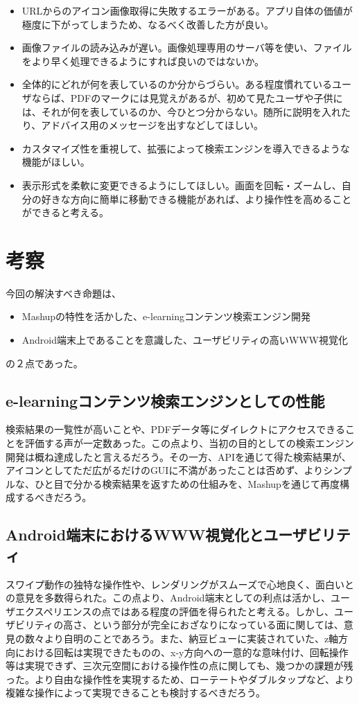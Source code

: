 \begin{itemize}
\item URLからのアイコン画像取得に失敗するエラーがある。アプリ自体の価値が極度に下がってしまうため、なるべく改善した方が良い。
\item 画像ファイルの読み込みが遅い。画像処理専用のサーバ等を使い、ファイルをより早く処理できるようにすれば良いのではないか。
\item 全体的にどれが何を表しているのか分からづらい。ある程度慣れているユーザならば、PDFのマークには見覚えがあるが、初めて見たユーザや子供には、それが何を表しているのか、今ひとつ分からない。随所に説明を入れたり、アドバイス用のメッセージを出すなどしてほしい。
\item カスタマイズ性を重視して、拡張によって検索エンジンを導入できるような機能がほしい。
\item 表示形式を柔軟に変更できるようにしてほしい。画面を回転・ズームし、自分の好きな方向に簡単に移動できる機能があれば、より操作性を高めることができると考える。
\end{itemize}

\section{考察}
今回の解決すべき命題は、
\begin{itemize}
\item Mashupの特性を活かした、e-learningコンテンツ検索エンジン開発
\item Android端末上であることを意識した、ユーザビリティの高いWWW視覚化
\end{itemize}
の２点であった。

\subsection{e-learningコンテンツ検索エンジンとしての性能}
検索結果の一覧性が高いことや、PDFデータ等にダイレクトにアクセスできることを評価する声が一定数あった。この点より、当初の目的としての検索エンジン開発は概ね達成したと言えるだろう。その一方、APIを通じて得た検索結果が、アイコンとしてただ広がるだけのGUIに不満があったことは否めず、よりシンプルな、ひと目で分かる検索結果を返すための仕組みを、Mashupを通じて再度構成するべきだろう。

\subsection{Android端末におけるWWW視覚化とユーザビリティ}
スワイプ動作の独特な操作性や、レンダリングがスムーズで心地良く、面白いとの意見を多数得られた。この点より、Android端末としての利点は活かし、ユーザエクスペリエンスの点ではある程度の評価を得られたと考える。しかし、ユーザビリティの高さ、という部分が完全におざなりになっている面に関しては、意見の数々より自明のことであろう。また、納豆ビュー\cite{natto}に実装されていた、z軸方向における回転は実現できたものの、x-y方向への一意的な意味付け、回転操作等は実現できず、三次元空間における操作性の点に関しても、幾つかの課題が残った。より自由な操作性を実現するため、ローテートやダブルタップなど、より複雑な操作によって実現できることも検討するべきだろう。